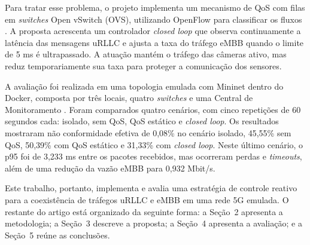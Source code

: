 \documentclass[12pt]{article}
\begin{document}
		Para tratar esse problema, o projeto implementa um mecanismo de QoS com filas em \textit{switches} Open vSwitch (OVS), utilizando OpenFlow para classificar os fluxos \cite{mckeown2008openflow,pfaff2015ovs,olegario2024qos5g}. A proposta acrescenta um controlador \textit{closed loop} que observa continuamente a latência das mensagens uRLLC e ajusta a taxa do tráfego eMBB quando o limite de 5 ms é ultrapassado. A atuação mantém o tráfego das câmeras ativo, mas reduz temporariamente sua taxa para proteger a comunicação dos sensores.

		A avaliação foi realizada em uma topologia emulada com Mininet dentro do Docker, composta por três locais, quatro \textit{switches} e uma Central de Monitoramento \cite{mininet}. Foram comparados quatro cenários, com cinco repetições de 60 segundos cada: isolado, sem QoS, QoS estático e \textit{closed loop}. Os resultados mostraram não conformidade efetiva de 0,08\% no cenário isolado, 45,55\% sem QoS, 50,39\% com QoS estático e 31,33\% com \textit{closed loop}. Neste último cenário, o p95 foi de 3,233 ms entre os pacotes recebidos, mas ocorreram perdas e \textit{timeouts}, além de uma redução da vazão eMBB para 0,932 Mbit/s.

		Este trabalho, portanto, implementa e avalia uma estratégia de controle reativo para a coexistência de tráfegos uRLLC e eMBB em uma rede 5G emulada. O restante do artigo está organizado da seguinte forma: a Seção~2 apresenta a metodologia; a Seção~3 descreve a proposta; a Seção~4 apresenta a avaliação; e a Seção~5 reúne as conclusões. 
		
		
		
		
\end{document}
